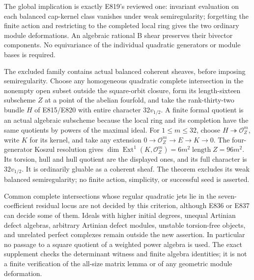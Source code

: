 The global implication is exactly E819's reviewed one: invariant
evaluation on each balanced cap-kernel class vanishes under weak
semiregularity; forgetting the finite action and restricting to the
completed local ring gives the two ordinary module deformations. An
algebraic rational B shear preserves their bivector components. No
equivariance of the individual quadratic generators or module bases is
required.

The excluded family contains actual balanced coherent sheaves, before
imposing semiregularity. Choose any homogeneous quadratic complete
intersection in the nonempty open subset outside the square-orbit
closure, form its length-sixteen subscheme \(Z\) at a point of the
abelian fourfold, and take the rank-thirty-two bundle \(H\) of E815/E820
with entire character \(32v_{1/2}\). A finite formal quotient is an
actual algebraic subscheme because the local ring and its completion
have the same quotients by powers of the maximal ideal. For
\(1\le m\le32\), choose \(H\twoheadrightarrow\mathcal O_Z^m\), write
\(K\) for its kernel, and take any extension
\(0\to\mathcal O_Z^m\to E\to K\to0\). The four-generator Koszul
resolution gives
\(\dim\operatorname{Ext}^1(K,\mathcal O_Z^m)=6m^2\operatorname{length}Z=96m^2\).
Its torsion, hull and hull quotient are the displayed ones, and its full
character is \(32v_{1/2}\). It is ordinarily gluable as a coherent
sheaf. The theorem excludes its weak balanced semiregularity; no finite
action, simplicity, or successful seed is asserted.

Common complete intersections whose regular quadratic jets lie in the
seven-coefficient residual locus are not decided by this criterion,
although E836 or E837 can decide some of them. Ideals with higher
initial degrees, unequal Artinian defect algebras, arbitrary Artinian
defect modules, unstable torsion-free objects, and unrelated perfect
complexes remain outside the new assertion. In particular no passage to
a square quotient of a weighted power algebra is used. The exact
supplement checks the determinant witness and finite algebra identities;
it is not a finite verification of the all-size matrix lemma or of any
geometric module deformation.
